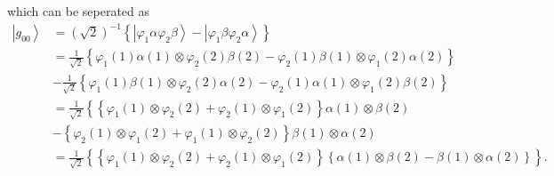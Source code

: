 \documentclass[aps,preprint]{revtex4}%
\begin{document}
which can be seperated as%
\begin{align}
\left\vert g_{00}\right\rangle  &  =\left(  \sqrt{2}\right)  ^{-1}\left\{
\left\vert \varphi_{1}\alpha\varphi_{2}\beta\right\rangle -\left\vert
\varphi_{1}\beta\varphi_{2}\alpha\right\rangle \right\} \nonumber\\
&  =\frac{1}{\sqrt{2}}\left\{  \varphi_{1}\left(  1\right)  \alpha\left(
1\right)  \otimes\varphi_{2}\left(  2\right)  \beta\left(  2\right)
-\varphi_{2}\left(  1\right)  \beta\left(  1\right)  \otimes\varphi_{1}\left(
2\right)  \alpha\left(  2\right)  \right\} \nonumber\\
&  -\frac{1}{\sqrt{2}}\left\{  \varphi_{1}\left(  1\right)  \beta\left(
1\right)  \otimes\varphi_{2}\left(  2\right)  \alpha\left(  2\right)
-\varphi_{2}\left(  1\right)  \alpha\left(  1\right)  \otimes\varphi
_{1}\left(  2\right)  \beta\left(  2\right)  \right\} \nonumber\\
&  =\frac{1}{\sqrt{2}}\left\{  \left\{  \varphi_{1}\left(  1\right)
\otimes\varphi_{2}\left(  2\right)  +\varphi_{2}\left(  1\right)
\otimes\varphi_{1}\left(  2\right)  \right\}  \alpha\left(  1\right)
\otimes\beta\left(  2\right)  \right. \nonumber\\
&  -\left\{  \varphi_{2}\left(  1\right)  \otimes\varphi_{1}\left(  2\right)
+\varphi_{1}\left(  1\right)  \otimes\varphi_{2}\left(  2\right)  \right\}
\beta\left(  1\right)  \otimes\alpha\left(  2\right) \nonumber\\
&  =\frac{1}{\sqrt{2}}\left\{  \left\{  \varphi_{1}\left(  1\right)
\otimes\varphi_{2}\left(  2\right)  +\varphi_{2}\left(  1\right)
\otimes\varphi_{1}\left(  2\right)  \right\}  \left\{  \alpha\left(  1\right)
\otimes\beta\left(  2\right)  -\beta\left(  1\right)  \otimes\alpha\left(
2\right)  \right\}  \right\}  .
\end{align}
\end{document}
